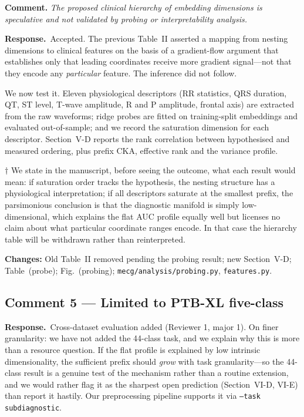 \documentclass[11pt,a4paper]{article}
\newcommand{\comment}[1]{\par\medskip\noindent\textcolor{revblue}{\textbf{Comment.} \textit{#1}}\par\smallskip}
\newcommand{\response}{\par\noindent\textbf{Response.}\ }
\newcommand{\changed}[1]{\par\smallskip\noindent\textbf{Changes:} #1\par}
\begin{document}
\comment{The proposed clinical hierarchy of embedding dimensions is
speculative and not validated by probing or interpretability analysis.}

\response Accepted. The previous Table~II asserted a mapping from nesting
dimensions to clinical features on the basis of a gradient-flow argument that
establishes only that leading coordinates receive more gradient signal---not
that they encode any \emph{particular} feature. The inference did not follow.

We now test it. Eleven physiological descriptors (RR statistics, QRS duration,
QT, ST level, T-wave amplitude, R and P amplitude, frontal axis) are extracted
from the raw waveforms; ridge probes are fitted on training-split embeddings
and evaluated out-of-sample; and we record the saturation dimension for each
descriptor. Section~V-D reports the rank correlation between hypothesised and
measured ordering, plus prefix CKA, effective rank and the variance profile.

$\dagger$ We state in the manuscript, before seeing the outcome, what each
result would mean: if saturation order tracks the hypothesis, the nesting
structure has a physiological interpretation; if all descriptors saturate at
the smallest prefix, the parsimonious conclusion is that the diagnostic
manifold is simply low-dimensional, which explains the flat AUC profile
equally well but licenses no claim about what particular coordinate ranges
encode. In that case the hierarchy table will be withdrawn rather than
reinterpreted.

\changed{Old Table~II removed pending the probing result; new Section~V-D;
Table~(probe); Fig.~(probing); \texttt{mecg/analysis/probing.py},
\texttt{features.py}.}

\subsection*{Comment 5 --- Limited to PTB-XL five-class}

\response Cross-dataset evaluation added (Reviewer 1, major 1). On finer
granularity: we have not added the 44-class task, and we explain why this is
more than a resource question. If the flat profile is explained by low
intrinsic dimensionality, the sufficient prefix should \emph{grow} with task
granularity---so the 44-class result is a genuine test of the mechanism rather
than a routine extension, and we would rather flag it as the sharpest open
prediction (Section~VI-D, VI-E) than report it hastily. Our preprocessing
pipeline supports it via \texttt{--task subdiagnostic}.
\end{document}

